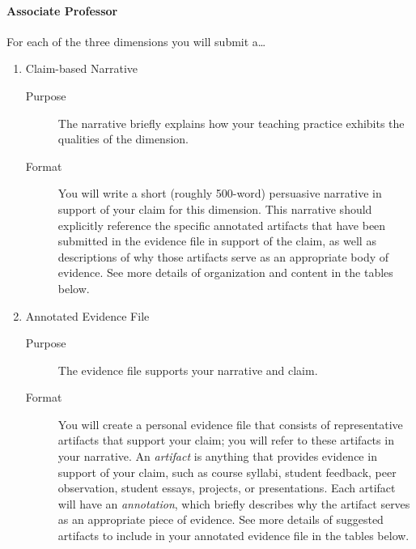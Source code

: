 \documentclass[11pt,titlepage]{article}
\begin{document}
\paragraph{Associate Professor}
For each of the three dimensions you will submit a\dots
\begin{enumerate}
  \item Claim-based Narrative
  \begin{description}
    \item[Purpose]
    The narrative briefly explains how your teaching practice exhibits the qualities of the dimension.

    \item[Format]
    You will write a short (roughly 500-word) persuasive narrative in support of your claim for this dimension.
    This narrative should explicitly reference the specific annotated artifacts that have been submitted in the evidence file in support of the claim, as well as descriptions of why those artifacts serve as an appropriate body of evidence.
    See more details of organization and content in the tables below.
  \end{description}

  \item Annotated Evidence File
  \begin{description}
    \item[Purpose]
    The evidence file supports your narrative and claim.

    \item[Format]
    You will create a personal evidence file that consists of representative artifacts that support your claim; you will refer to these artifacts in your narrative.
    An \emph{artifact} is anything that provides evidence in support of your claim, such as course syllabi, student feedback, peer observation, student essays, projects, or presentations.
    Each artifact will have an \emph{annotation}, which briefly describes why the artifact serves as an appropriate piece of evidence.
    See more details of suggested artifacts to include in your annotated evidence file in the tables below.
  \end{description}
\end{enumerate}
\end{document}
